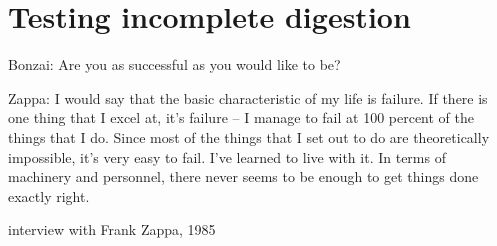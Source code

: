 \documentclass[a4paper,12pt,times,authoryear,twoside,print,index]{Classes/PhDThesisPSnPDF}\usepackage[]{graphicx}\usepackage[]{color}
\begin{document}
\ifpdf
    \graphicspath{
    {./Figs/Raster/}
    {./Figs/PDF/}
    {./Figs/}
    {/Users/Claudius/Documents/PhD/THESIS/kks32/LaTeX/Data_analysis/reference-mapping/figure/}
    {/Users/Claudius/Documents/PhD/THESIS/kks32/LaTeX/3_Chapter/Figs/}
    }
\else
    \graphicspath{ 
    {/Users/Claudius/Documents/PhD/THESIS/kks32/LaTeX/3_Chapter/Figs/}
    }
\fi



%
%
%
\chapter{Testing incomplete digestion}
%
%
%

%

\epigraph{
Bonzai: Are you as successful as you would like to be?

Zappa: I would say that the basic characteristic of my life is failure. 
If there is one thing that I excel at, it's failure -- I manage to fail at 100 percent of the things that I do. 
Since most of the things that I set out to do are theoretically impossible, it's very easy to fail. 
I've learned to live with it. 
In terms of machinery and personnel, there never seems to be enough to get things done exactly right.
}{interview with Frank Zappa, 1985}


\end{document}
